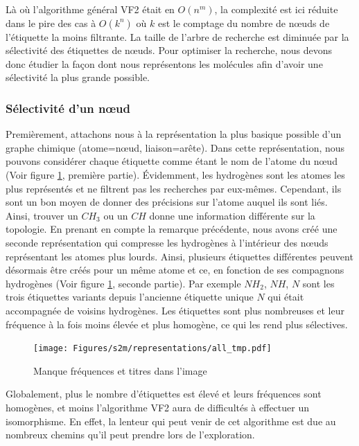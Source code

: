 Là où l'algorithme général VF2 était en $O(n^m)$, la complexité est ici réduite dans le pire des cas à $O(k^n)$ où $k$ est le comptage du nombre de n\oe{}uds de l'étiquette la moins filtrante.
La taille de l'arbre de recherche est diminuée par la sélectivité des étiquettes de n\oe{}uds.
Pour optimiser la recherche, nous devons donc étudier la façon dont nous représentons les molécules afin d'avoir une sélectivité
la plus grande possible.

\subsubsection{Sélectivité d'un n\oe{}ud}

\label{selectiv_p}

Premièrement, attachons nous à la représentation la plus basique possible d'un graphe chimique (atome=n\oe{}ud,
liaison=arête). Dans cette représentation, nous pouvons considérer chaque étiquette comme étant le nom de l'atome du n\oe{}ud (Voir
figure \ref{representations}, première partie). Évidemment, les hydrogènes sont les atomes les plus représentés et ne filtrent
pas les recherches par eux-mêmes. Cependant, ils sont un bon moyen de donner des précisions sur l'atome auquel ils sont liés.
Ainsi, trouver un $CH_{3}$ ou un $CH$ donne une information différente sur la topologie.
En prenant en compte la remarque précédente, nous avons créé une seconde représentation qui compresse les hydrogènes à l'intérieur
des n\oe{}uds représentant les atomes plus lourds.
Ainsi, plusieurs étiquettes différentes peuvent
désormais être créés pour un même atome et ce, en fonction de ses compagnons hydrogènes (Voir figure \ref{representations},
seconde partie). Par exemple $NH_2$, $NH$, $N$ sont les
trois étiquettes variants depuis l'ancienne étiquette unique $N$ qui était accompagnée de voisins hydrogènes. Les étiquettes sont plus nombreuses et leur fréquence à la fois moins élevée et plus homogène, ce qui les rend plus sélectives.

\begin{figure}[!ht]
  \texttt{[image: Figures/s2m/representations/all\_tmp.pdf]}
  \caption{\label{representations}Manque fréquences et titres dans l'image}
\end{figure}

Globalement, plus le nombre d'étiquettes est élevé et leurs fréquences sont homogènes, et moins l'algorithme VF2 aura de
difficultés à effectuer un isomorphisme. En effet, la lenteur qui peut venir de cet algorithme est due au nombreux chemins qu'il
peut prendre lors de l'exploration.

